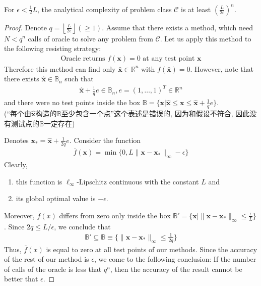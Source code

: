 \begin{theorem}\label{T7}
    For $\epsilon<\frac{1}{2}L$, the analytical complexity of problem class $\mathcal{C}$ is at least $\left( \frac{L}{2\epsilon} \right)^n$. 
\end{theorem}
\begin{proof}
    Denote $q=\left\lfloor \frac{L}{2\epsilon} \right\rfloor(\ge 1)$. Assume that there exists a method, which need $N<q^n$ calls of oracle to solve any problem from $\mathcal{C}$. Let us apply this method to the following resisting strategy:
    \begin{align*}
        \text{Oracle returns $f(\bm x)=0$ at any test point $\bm x$}
    \end{align*}
    Therefore this method can find only $\bar{\bm x}\in \mathbb{R}^n$ with $f(\bar{\bm x})=0$. However, note that there exists $\hat{\bm x}\in \mathbb{B}_n$ such that 
    \begin{align*}
        \hat{\bm x}+\frac{1}{q}e\in\mathbb{B}_n, e=(1,\dots,1)^T\in \mathbb{R}^n
    \end{align*}
    and there were no test points inside the box $\mathbb{B}=\{ \bm x|\hat{\bm x}\le \bm x\le \hat{\bm x}+\frac{1}{q}e \}$. \\
    (``每个由$\hat{\bm x}$构造的$\mathbb{B}$至少包含一个点''这个表述是错误的, 因为和假设不符合, 因此没有测试点的$\mathbb{B}$一定存在)

    Denotes $\bm x_*=\hat{\bm x}+\frac{1}{2q}e$. Consider the function
    \begin{align*}
        \bar{f}(\bm x)=\min\{ 0, L\| \bm x-\bm x_* \|_\infty-\epsilon \}
    \end{align*}
    Clearly, 
    \begin{enumerate}
        \item this function is $\ell_\infty$-Lipschitz continuous with the constant $L$ and
        \item its global optimal value is $-\epsilon$. 
    \end{enumerate}
    Moreover, $\bar f(x)$ differs from zero only inside the box $\mathbb{B}'=\{ \bm x| \| \bm x-\bm x_* \|_\infty \le \frac{\epsilon}{L} \}$. Since $2q\le L/\epsilon$, we conclude that
    \begin{align*}
        \mathbb{B}'\subseteq \mathbb{B}\equiv\{ \| \bm x-\bm x_* \|_\infty \le\frac{1}{2q} \}
    \end{align*}
    Thus, $\bar f(x)$ is equal to zero at all test points of our methods. Since the accuracy of the rest of our method is $\epsilon$, we come to the following conclusion: If the number of calls of the oracle is less that $q^n$, then the accuracy of the result cannot be better that $\epsilon$. 
\end{proof}

